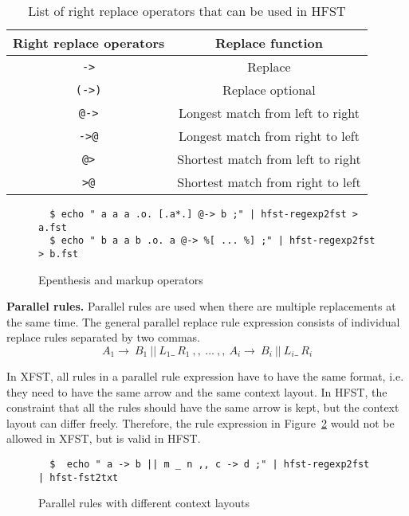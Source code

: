 \documentclass{llncs}
\begin{document}
\begin{table} [h!]
  \centering
  \caption{List of right replace operators that can be used in HFST}
  \begin{tabular}{c  c} 
    \hline
    Right replace operators & Replace function \\ \hline
    \verb!->!   & Replace \\ 
    \verb!(->)! & Replace optional \\
    \verb!@->!  & Longest match from left to right \\ 
    \verb!->@!  & Longest match from right to left \\ 
    \verb!@>!   & Shortest match from left to right \\
    \verb!>@!   & Shortest match from right to left \\  \hline
  \end{tabular}
  \label{tab:replace_operators}
\end{table}



\begin{figure} [h!]
{\footnotesize
\begin{verbatim}
  $ echo " a a a .o. [.a*.] @-> b ;" | hfst-regexp2fst > a.fst
  $ echo " b a a b .o. a @-> %[ ... %] ;" | hfst-regexp2fst > b.fst
\end{verbatim}
}
\caption{Epenthesis and markup operators}
\label{fig:epenthesis_markup}
\end{figure}



\textbf{Parallel rules.} Parallel rules are used when there are 
multiple replacements at the same time. The general parallel replace rule expression 
consists of individual replace rules separated by two commas.
\begin{equation}
  A_1 \rightarrow\ B_1\ ||\ L_1 \_\  R_1\ ,,\ \ldots\ ,,\ A_i \rightarrow\ B_i\ ||\ L_i \_\ R_i
\end{equation}

In XFST, all rules in a parallel rule expression have to have the same format, i.e. 
they need to have the same arrow and the same context layout. 
In HFST, the constraint that all the rules should have the same arrow is kept, 
but the context layout can differ freely. 
Therefore, the rule expression in Figure~\ref{fig:parallel_rules} 
would not be allowed in XFST, but is valid in HFST.
\begin{figure}
{\footnotesize
\begin{verbatim}
  $  echo " a -> b || m _ n ,, c -> d ;" | hfst-regexp2fst | hfst-fst2txt
\end{verbatim}
}
\caption{Parallel rules with different context layouts}
\label{fig:parallel_rules}
\end{figure}
\end{document}
